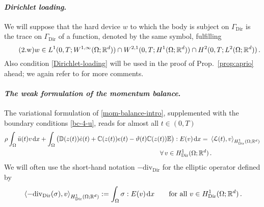 \documentclass[a4paper,10pt,reqno]{amsart}
\numberwithin{equation}{section}
\newcommand{\R}{\mathbb{R}}
\numberwithin{equation}{section}
\def\dd{\;\!\mathrm{d}} %
\newcommand{\pairing}[4]{ \sideset{_{ #1 }}{_{ #2 }}  {\mathop{\langle #3 , #4
\rangle}}}
\newcommand{\teta}{\vartheta}
\newcommand{\foraa}{\text{for a.a. }}
\newcommand{\sig}[1]{E(#1)}
\newcommand{\Dir}{\mathrm{Dir}}
\newcommand{\bbC}{\mathbb{C}}
\newcommand{\bbD}{\mathbb{D}}
\newcommand{\bbE}{\mathbb{E}}
\newcommand{\EEE}{\color{black}}
\begin{document}
\paragraph{{\em Dirichlet loading}.}
We will suppose that the hard device  $w$ to which the body is subject on $\Gamma_\Dir$  is the trace on $\Gamma_\Dir$  of a function, denoted by the same symbol,  fulfilling
\begin{equation}
\label{Dirichlet-loading}
\tag{2.$\mathrm{w}$} 
w \in  L^1(0,T; W^{1,\infty} (\Omega;\R^d)) \cap W^{2,1} (0,T;H^1(\Omega;\R^d)) \cap H^2(0,T; L^2(\Omega;\R^d))\,.
\end{equation}
Also condition   \eqref{Dirichlet-loading} will be used in the proof of Prop.\  \ref{prop:aprio}  ahead; we again
  refer to \cite[Rmk.\ 4.4]{Rossi2016} for more comments. %
\paragraph{{\em The weak formulation of the momentum balance}.} The variational formulation of  \eqref{mom-balance-intro}, supplemented with the boundary conditions
\eqref{bc-4-u},
reads for almost all $t\in (0,T)$
\begin{equation}
\label{w-momentum-balance}
\begin{aligned}
\rho\int_\Omega \ddot{u}(t) v \dd x + \int_\Omega \big(\bbD(z(t)) \dot{e}(t) + \bbC(z(t)) e(t)  & - \teta(t) \bbC(z(t)) \bbE \big): \sig v \dd x     = \pairing{}{H_\Dir^1(\Omega;\R^d)}{\calL(t)}{v}  \\ & \qquad \qquad \quad \forall\, v \in H_\Dir^1(\Omega;\R^d)\,.
\end{aligned}
\end{equation}
We will often use the short-hand notation $-\mathrm{div}_{\Dir}$ for the elliptic operator  defined by 
\begin{equation}
\label{div-Gdir}
\pairing{}{ H_\Dir^1(\Omega;\R^d) }{-\mathrm{div}_{\Dir}(\sigma)}{v}: = \int_\Omega \sigma : \sig v \dd x \qquad \text{for all } v \in  H_\Dir^1(\Omega;\R^d) \,.
\end{equation}
\end{document}
